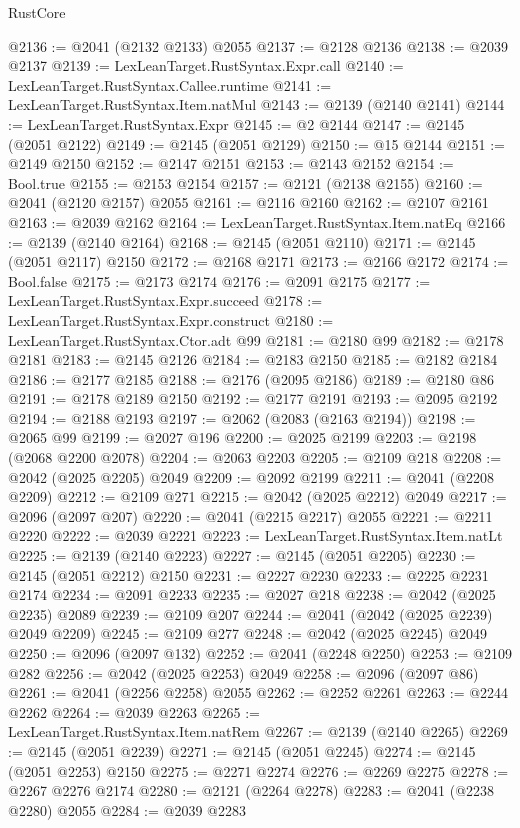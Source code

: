 \begin{lexlean}{RustCore}
\begin{coremodule}
@2136 := @2041 (@2132 @2133) @2055
@2137 := @2128 @2136
@2138 := @2039 @2137
@2139 := LexLeanTarget.RustSyntax.Expr.call
@2140 := LexLeanTarget.RustSyntax.Callee.runtime
@2141 := LexLeanTarget.RustSyntax.Item.natMul
@2143 := @2139 (@2140 @2141)
@2144 := LexLeanTarget.RustSyntax.Expr
@2145 := @2 @2144
@2147 := @2145 (@2051 @2122)
@2149 := @2145 (@2051 @2129)
@2150 := @15 @2144
@2151 := @2149 @2150
@2152 := @2147 @2151
@2153 := @2143 @2152
@2154 := Bool.true
@2155 := @2153 @2154
@2157 := @2121 (@2138 @2155)
@2160 := @2041 (@2120 @2157) @2055
@2161 := @2116 @2160
@2162 := @2107 @2161
@2163 := @2039 @2162
@2164 := LexLeanTarget.RustSyntax.Item.natEq
@2166 := @2139 (@2140 @2164)
@2168 := @2145 (@2051 @2110)
@2171 := @2145 (@2051 @2117) @2150
@2172 := @2168 @2171
@2173 := @2166 @2172
@2174 := Bool.false
@2175 := @2173 @2174
@2176 := @2091 @2175
@2177 := LexLeanTarget.RustSyntax.Expr.succeed
@2178 := LexLeanTarget.RustSyntax.Expr.construct
@2180 := LexLeanTarget.RustSyntax.Ctor.adt @99
@2181 := @2180 @99
@2182 := @2178 @2181
@2183 := @2145 @2126
@2184 := @2183 @2150
@2185 := @2182 @2184
@2186 := @2177 @2185
@2188 := @2176 (@2095 @2186)
@2189 := @2180 @86
@2191 := @2178 @2189 @2150
@2192 := @2177 @2191
@2193 := @2095 @2192
@2194 := @2188 @2193
@2197 := @2062 (@2083 (@2163 @2194))
@2198 := @2065 @99
@2199 := @2027 @196
@2200 := @2025 @2199
@2203 := @2198 (@2068 @2200 @2078)
@2204 := @2063 @2203
@2205 := @2109 @218
@2208 := @2042 (@2025 @2205) @2049
@2209 := @2092 @2199
@2211 := @2041 (@2208 @2209)
@2212 := @2109 @271
@2215 := @2042 (@2025 @2212) @2049
@2217 := @2096 (@2097 @207)
@2220 := @2041 (@2215 @2217) @2055
@2221 := @2211 @2220
@2222 := @2039 @2221
@2223 := LexLeanTarget.RustSyntax.Item.natLt
@2225 := @2139 (@2140 @2223)
@2227 := @2145 (@2051 @2205)
@2230 := @2145 (@2051 @2212) @2150
@2231 := @2227 @2230
@2233 := @2225 @2231 @2174
@2234 := @2091 @2233
@2235 := @2027 @218
@2238 := @2042 (@2025 @2235) @2089
@2239 := @2109 @207
@2244 := @2041 (@2042 (@2025 @2239) @2049 @2209)
@2245 := @2109 @277
@2248 := @2042 (@2025 @2245) @2049
@2250 := @2096 (@2097 @132)
@2252 := @2041 (@2248 @2250)
@2253 := @2109 @282
@2256 := @2042 (@2025 @2253) @2049
@2258 := @2096 (@2097 @86)
@2261 := @2041 (@2256 @2258) @2055
@2262 := @2252 @2261
@2263 := @2244 @2262
@2264 := @2039 @2263
@2265 := LexLeanTarget.RustSyntax.Item.natRem
@2267 := @2139 (@2140 @2265)
@2269 := @2145 (@2051 @2239)
@2271 := @2145 (@2051 @2245)
@2274 := @2145 (@2051 @2253) @2150
@2275 := @2271 @2274
@2276 := @2269 @2275
@2278 := @2267 @2276 @2174
@2280 := @2121 (@2264 @2278)
@2283 := @2041 (@2238 @2280) @2055
@2284 := @2039 @2283

\end{coremodule}
\end{lexlean}
